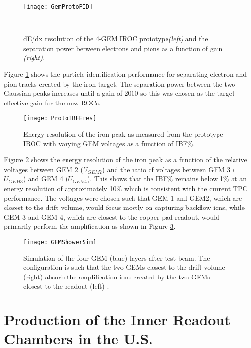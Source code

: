 \begin{figure}[h]
\texttt{[image: GemProtoPID]}
\centering
\caption{dE/dx resolution of the 4-GEM IROC prototype\textit{(left)} and the separation power between electrons and pions as a function of gain \textit{(right)}\cite{CERN-LHCC-2015-002}.}\

\label{fig:GemProtoPID}
\end{figure}

Figure \ref{fig:GemProtoPID} shows the particle identification performance for separating electron and pion tracks created by the iron target.  The separation power between the two Gaussian peaks increases until a gain of 2000 so this was chosen as the target effective gain for the new ROCs.



\begin{figure}[h]
\texttt{[image: ProtoIBFEres]}
\centering
\caption{Energy resolution of the iron peak as measured from the prototype IROC with varying GEM voltages as a function of IBF\%\cite{CERN-LHCC-2015-002}.}
\label{fig:ProtoIBFEres}
\end{figure}


Figure \ref{fig:ProtoIBFEres} shows the energy resolution of the iron peak as a function of the relative voltages between GEM 2 ($U_{GEM2}$) and the ratio of voltages between GEM 3 ($U_{GEM3}$) and GEM 4 ($U_{GEM4}$).  This shows that the IBF\% remains below 1\% at an energy resolution of approximately 10\% which is consistent with the current TPC performance.  The voltages were chosen such that GEM 1 and GEM2, which are closest to the drift volume, would focus mostly on capturing backflow ions, while GEM 3 and GEM 4, which are closest to the copper pad readout, would primarily perform the amplification as shown in Figure \ref{fig:showersim}.

\begin{figure}[h]
\texttt{[image: GEMShowerSim]}
\centering
\caption{Simulation of the four GEM (blue) layers after test beam.  The configuration is such that the two GEMs closest to the drift volume (right) absorb the amplification ions created by the two GEMs closest to the readout (left) \cite{CERN-LHCC-2015-002}.}
\label{fig:showersim}
\end{figure}

\section{Production of the Inner Readout Chambers in the U.S.}

